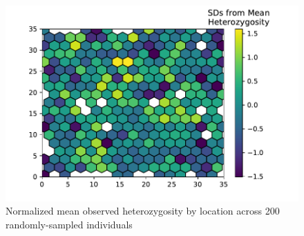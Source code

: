 \documentclass[10pt,twoside,lineno]{gsajnl}
\begin{document}
\afterpage{\clearpage}
\begin{figure}[p]
\centering
\includegraphics[]{figures/het_z_by_ind.pdf}
\caption{Normalized mean observed heterozygosity by location across 200 randomly-sampled individuals}
\label{fig:hetmap}
\end{figure}
\end{document}
